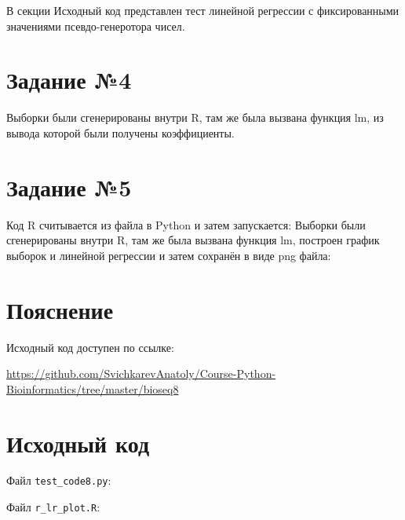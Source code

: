 \documentclass{article} %
\begin{document}
%

В секции Исходный код представлен тест линейной регрессии с фиксированными значениями псевдо-генеротора чисел.

\section{Задание №4}
Выборки были сгенерированы внутри R, там же была вызвана функция lm, из вывода которой были получены коэффициенты.
\newpage
%

\section{Задание №5}
Код R считывается из файла в Python и затем запускается:
%
\newpage
Выборки были сгенерированы внутри R, там же была вызвана функция lm, построен график выборок и линейной регрессии и затем сохранён в виде png файла:


\section{Пояснение}
Исходный код доступен по ссылке:

\href{https://github.com/SvichkarevAnatoly/Course-Python-Bioinformatics/tree/master/bioseq7}{https://github.com/SvichkarevAnatoly/Course-Python-Bioinformatics/tree/master/bioseq8}

\section{Исходный код}
Файл \verb$test_code8.py$:
%

Файл \verb$r_lr_plot.R$:
%
\end{document}

